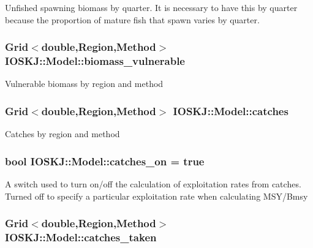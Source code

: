 Unfished spawning biomass by quarter. It is necessary to have this by quarter because the proportion of mature fish that spawn varies by quarter. \hypertarget{classIOSKJ_1_1Model_a045137b448927ff2b8d1269d6bb83630}{
\subsubsection[{biomass\-\_\-vulnerable}]{\setlength{\rightskip}{0pt plus 5cm}Grid$<$double,Region,Method$>$ I\-O\-S\-K\-J\-::\-Model\-::biomass\-\_\-vulnerable}}\label{classIOSKJ_1_1Model_a045137b448927ff2b8d1269d6bb83630}
Vulnerable biomass by region and method \hypertarget{classIOSKJ_1_1Model_aa37aad25cd7cc8a4efc5fb6de72bd7e3}{
\subsubsection[{catches}]{\setlength{\rightskip}{0pt plus 5cm}Grid$<$double,Region,Method$>$ I\-O\-S\-K\-J\-::\-Model\-::catches}}\label{classIOSKJ_1_1Model_aa37aad25cd7cc8a4efc5fb6de72bd7e3}
Catches by region and method \hypertarget{classIOSKJ_1_1Model_a08d60d30e87f40f9b2eb4aa9b2d44490}{
\subsubsection[{catches\-\_\-on}]{\setlength{\rightskip}{0pt plus 5cm}bool I\-O\-S\-K\-J\-::\-Model\-::catches\-\_\-on = true}}\label{classIOSKJ_1_1Model_a08d60d30e87f40f9b2eb4aa9b2d44490}
A switch used to turn on/off the calculation of exploitation rates from catches. Turned off to specify a particular exploitation rate when calculating M\-S\-Y/\-Bmsy \hypertarget{classIOSKJ_1_1Model_a2d473830abac1f8f4367621a33deb9ca}{
\subsubsection[{catches\-\_\-taken}]{\setlength{\rightskip}{0pt plus 5cm}Grid$<$double,Region,Method$>$ I\-O\-S\-K\-J\-::\-Model\-::catches\-\_\-taken}}\label{classIOSKJ_1_1Model_a2d473830abac1f8f4367621a33deb9ca}
